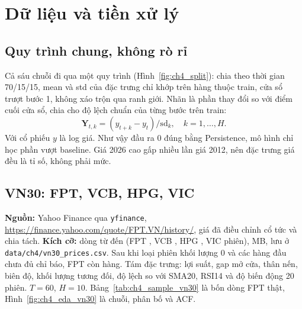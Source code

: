 \section{Dữ liệu và tiền xử lý}
\subsection{Quy trình chung, không rò rỉ}
Cả sáu chuỗi đi qua một quy trình (Hình~\ref{fig:ch4_split}): chia theo thời gian 70/15/15, mean và std của đặc trưng chỉ khớp trên hàng thuộc train, cửa sổ trượt bước 1, không xáo trộn qua ranh giới. Nhãn là phần thay đổi so với điểm cuối cửa sổ, chia cho độ lệch chuẩn của từng bước trên train:
\begin{equation}
\mathbf{Y}_{t,k}=(y_{t+k}-y_t)/\mathrm{sd}_k,\quad k=1,\dots,H .
\end{equation}
Với cổ phiếu $y$ là log giá. Như vậy đầu ra 0 đúng bằng Persistence, mô hình chỉ học phần vượt baseline. Giá 2026 cao gấp nhiều lần giá 2012, nên đặc trưng giá đều là tỉ số, không phải mức.


\subsection{VN30: FPT, VCB, HPG, VIC}
\textbf{Nguồn:} Yahoo Finance qua \texttt{yfinance}, \url{https://finance.yahoo.com/quote/FPT.VN/history/}, giá đã điều chỉnh cổ tức và chia tách. \textbf{Kích cỡ:}  dòng từ  đến  (FPT , VCB , HPG , VIC  phiên),  MB, lưu ở \texttt{data/ch4/vn30\_prices.csv}. Sau khi loại phiên khối lượng 0 và các hàng đầu chưa đủ chỉ báo, FPT còn  hàng. Tám đặc trưng: lợi suất, gap mở cửa, thân nến, biên độ, khối lượng tương đối, độ lệch so với SMA20, RSI14 và độ biến động 20 phiên. $T=60$, $H=10$. Bảng~\ref{tab:ch4_sample_vn30} là bốn dòng FPT thật, Hình~\ref{fig:ch4_eda_vn30} là chuỗi, phân bố và ACF.


